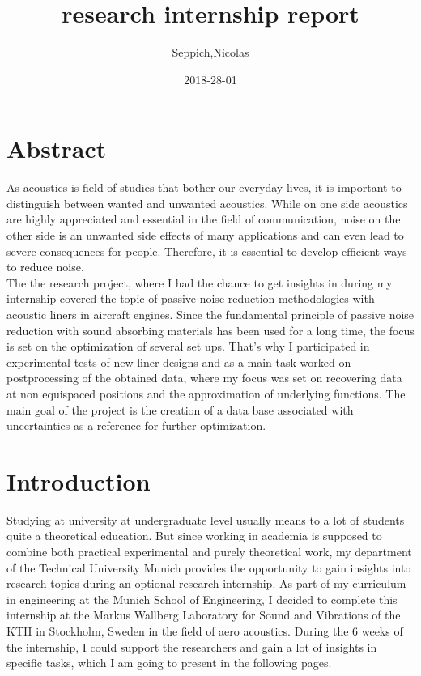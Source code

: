 \documentclass{article}
\title{research internship report}
\date{2018-28-01}
\author{Seppich,Nicolas}
\begin{document}
\maketitle
{}
\newpage
{}

\setcounter{secnumdepth}{5}

\section{Abstract}
As acoustics is field of studies that bother our everyday lives, it is important to distinguish between wanted and unwanted acoustics. While on one side acoustics are highly appreciated and essential in the field of communication, noise on the other side is an unwanted side effects of many applications and can even lead to severe consequences for people. Therefore, it is essential to develop efficient ways to reduce noise.\\
The the research project, where I had the chance to get insights in during my internship covered the topic of passive noise reduction methodologies with acoustic liners in aircraft engines. Since the fundamental principle of passive noise reduction with sound absorbing materials has been used for a long time, the focus is set on the optimization of several set ups. That’s why I participated in experimental tests of new liner designs and as a main task worked on postprocessing of the obtained data, where my focus was set on recovering data at non equispaced positions and the approximation of underlying functions. The main goal of the project is the creation of a data base associated with uncertainties as a reference for further optimization.  

\newpage 

\section{Introduction} 
Studying at university at undergraduate level usually means to a lot of students quite a theoretical education. But since working in academia is supposed to combine both practical experimental and purely theoretical work, my department of the Technical University Munich provides the opportunity to gain insights into research topics during an optional research internship. As part of my curriculum in engineering at the Munich School of Engineering, I decided to complete this internship at the Markus Wallberg Laboratory for Sound and Vibrations of the KTH in Stockholm, Sweden in the field of aero acoustics. During the 6 weeks of the internship, I could support the researchers and gain a lot of insights in specific tasks, which I am going to present in the following pages.  
\end{document}
